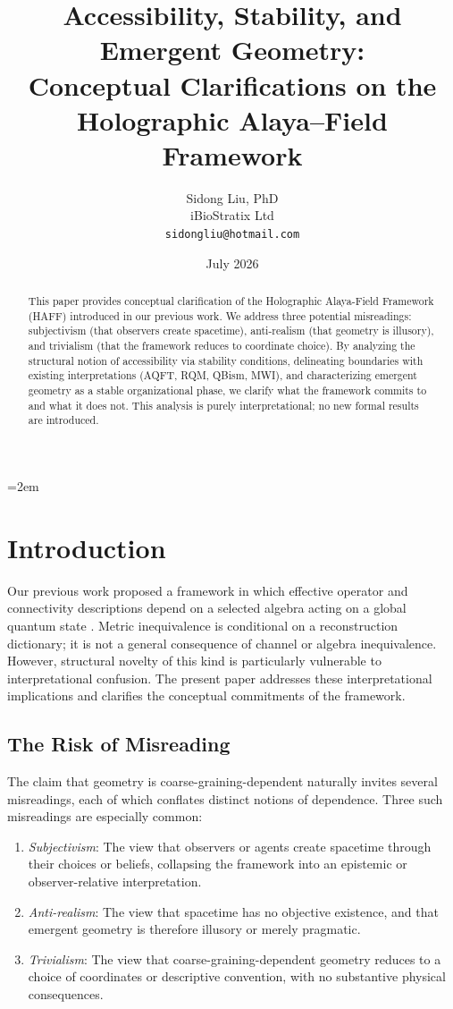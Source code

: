 \documentclass[12pt,a4paper]{article}
\title{Accessibility, Stability, and Emergent Geometry:\\
Conceptual Clarifications on the Holographic Alaya--Field Framework}
\author{
  Sidong Liu, PhD \\
  iBioStratix Ltd \\
  \texttt{sidongliu@hotmail.com}
}
\date{July 2026}
\begin{document}
\emergencystretch=2em
\raggedbottom
{}

\maketitle

\begin{abstract}
This paper provides conceptual clarification of the Holographic Alaya-Field Framework (HAFF) introduced in our previous work. 
We address three potential misreadings: subjectivism (that observers create spacetime), anti-realism (that geometry is illusory), and trivialism (that the framework reduces to coordinate choice). 
By analyzing the structural notion of accessibility via stability conditions, delineating boundaries with existing interpretations (AQFT, RQM, QBism, MWI), and characterizing emergent geometry as a stable organizational phase, we clarify what the framework commits to and what it does not. 
This analysis is purely interpretational; no new formal results are introduced.
\end{abstract}

\section{Introduction}
\label{sec:intro}

Our previous work proposed a framework in which effective operator and connectivity descriptions depend on a selected algebra acting on a global quantum state \cite{Liu2026}.  Metric inequivalence is conditional on a reconstruction dictionary; it is not a general consequence of channel or algebra inequivalence.
However, structural novelty of this kind is particularly vulnerable to interpretational confusion. 
The present paper addresses these interpretational implications and clarifies the conceptual commitments of the framework.

\subsection{The Risk of Misreading}

The claim that geometry is coarse-graining-dependent naturally invites several misreadings, each of which conflates distinct notions of dependence. 
Three such misreadings are especially common:

\begin{enumerate}
\item \emph{Subjectivism}: The view that observers or agents create spacetime through their choices or beliefs, collapsing the framework into an epistemic or observer-relative interpretation.
\item \emph{Anti-realism}: The view that spacetime has no objective existence, and that emergent geometry is therefore illusory or merely pragmatic.
\item \emph{Trivialism}: The view that coarse-graining-dependent geometry reduces to a choice of coordinates or descriptive convention, with no substantive physical consequences.
\end{enumerate}
\end{document}
